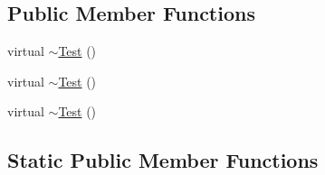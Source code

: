 \subsection*{Public Member Functions}
\begin{DoxyCompactItemize}
\item 
virtual \mbox{\hyperlink{classtesting_1_1_test_a2b0a62f1e667bbe8d8cb18d785bfa991}{$\sim$\+Test}} ()
\item 
virtual \mbox{\hyperlink{classtesting_1_1_test_ad99dc9b12208fd4bffc367f0a1e3df1b}{$\sim$\+Test}} ()
\item 
virtual \mbox{\hyperlink{classtesting_1_1_test_ad99dc9b12208fd4bffc367f0a1e3df1b}{$\sim$\+Test}} ()
\end{DoxyCompactItemize}
\subsection*{Static Public Member Functions}
